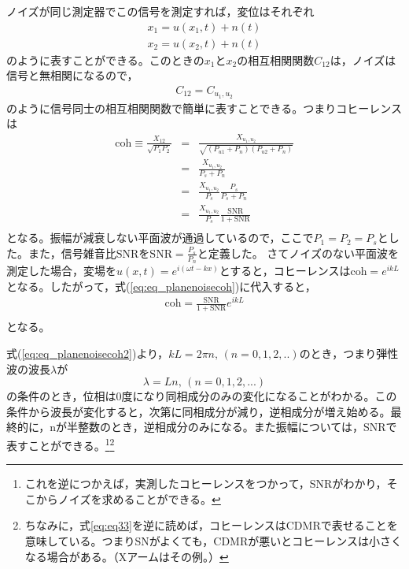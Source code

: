ノイズが同じ測定器でこの信号を測定すれば，変位はそれぞれ
\begin{eqnarray}
  x_1 = u(x_1,t) + n(t) \\
  x_2 = u(x_2,t) + n(t)
\end{eqnarray}
のように表すことができる。このときの$x_1$と$x_2$の相互相関関数$C_{12}$は，ノイズは信号と無相関になるので，
\begin{eqnarray}
  C_{12} = C_{u_1,u_2}
\end{eqnarray}
のように信号同士の相互相関関数で簡単に表すことできる。つまりコヒーレンスは
\begin{eqnarray}
  \mathrm{coh} \equiv \frac{X_{12}}{\sqrt{P_1P_2}} &=&
  \frac{X_{u_1,u_2}}{\sqrt{(P_{u1}+P_n)(P_{u2}+P_n)}} \\
  &=& \frac{X_{u_1,u_2}}{P_s + P_n}\\
  &=& \frac{X_{u_1,u_2}}{P_s}\frac{P_s}{P_s + P_n}\\
  &=& \frac{X_{u_1,u_2}}{P_s}\frac{\mathrm{SNR}}{1 + \mathrm{SNR}}\\ \label{eq:eq_planenoisecoh}
\end{eqnarray}
となる。振幅が減衰しない平面波が通過しているので，ここで$P_1=P_2=P_s$とした。また，信号雑音比$\mathrm{SNR}$を$\mathrm{SNR}=\frac{P_s}{P_n}$と定義した。
さてノイズのない平面波を測定した場合，変場を$u(x,t)=e^{i(\omega{t}-kx)}$とすると，コヒーレンスは$\mathrm{coh} = e^{ikL}$となる。したがって，式(\ref{eq:eq_planenoisecoh})に代入すると，
\begin{eqnarray}
  \mathrm{coh} = \frac{\mathrm{SNR}}{1 + \mathrm{SNR}}e^{ikL}\\ \label{eq:eq_planenoisecoh2}
\end{eqnarray}
となる。


式(\ref{eq:eq_planenoisecoh2})より，$kL=2\pi{n},\, (n=0,1,2,..) $のとき，つまり弾性波の波長$\lambda$が
\begin{equation}
  \lambda = {{L}}{n} , \, (n=0,1,2,...)
\end{equation}
の条件のとき，位相は0度になり同相成分のみの変化になることがわかる。この条件から波長が変化すると，次第に同相成分が減り，逆相成分が増え始める。最終的に，nが半整数のとき，逆相成分のみになる。また振幅については，SNRで表すことができる。\footnote[16]{これを逆につかえば，実測したコヒーレンスをつかって，SNRがわかり，そこからノイズを求めることができる。}\footnote[17]{ちなみに，式\ref{eq:eq33}を逆に読めば，コヒーレンスはCDMRで表せることを意味している。つまりSNがよくても，CDMRが悪いとコヒーレンスは小さくなる場合がある。（Xアームはその例。）}



